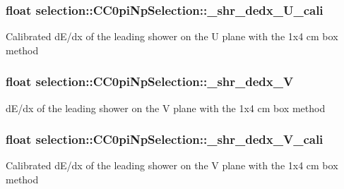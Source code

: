 \subsubsection[{\texorpdfstring{\+\_\+shr\+\_\+dedx\+\_\+\+U\+\_\+cali}{_shr_dedx_U_cali}}]{\setlength{\rightskip}{0pt plus 5cm}float selection\+::\+C\+C0pi\+Np\+Selection\+::\+\_\+shr\+\_\+dedx\+\_\+\+U\+\_\+cali\hspace{0.3cm}{\ttfamily [private]}}\hypertarget{classselection_1_1CC0piNpSelection_a7c90820db5398c179aef3186ab11e521}{}\label{classselection_1_1CC0piNpSelection_a7c90820db5398c179aef3186ab11e521}
Calibrated d\+E/dx of the leading shower on the U plane with the 1x4 cm box method 
\subsubsection[{\texorpdfstring{\+\_\+shr\+\_\+dedx\+\_\+V}{_shr_dedx_V}}]{\setlength{\rightskip}{0pt plus 5cm}float selection\+::\+C\+C0pi\+Np\+Selection\+::\+\_\+shr\+\_\+dedx\+\_\+V\hspace{0.3cm}{\ttfamily [private]}}\hypertarget{classselection_1_1CC0piNpSelection_a392211f6d023d92bf113c20098c5e7fe}{}\label{classselection_1_1CC0piNpSelection_a392211f6d023d92bf113c20098c5e7fe}
d\+E/dx of the leading shower on the V plane with the 1x4 cm box method 
\subsubsection[{\texorpdfstring{\+\_\+shr\+\_\+dedx\+\_\+\+V\+\_\+cali}{_shr_dedx_V_cali}}]{\setlength{\rightskip}{0pt plus 5cm}float selection\+::\+C\+C0pi\+Np\+Selection\+::\+\_\+shr\+\_\+dedx\+\_\+\+V\+\_\+cali\hspace{0.3cm}{\ttfamily [private]}}\hypertarget{classselection_1_1CC0piNpSelection_a0ef852fb0ecd8a3b6f871ed765be12da}{}\label{classselection_1_1CC0piNpSelection_a0ef852fb0ecd8a3b6f871ed765be12da}
Calibrated d\+E/dx of the leading shower on the V plane with the 1x4 cm box method 
